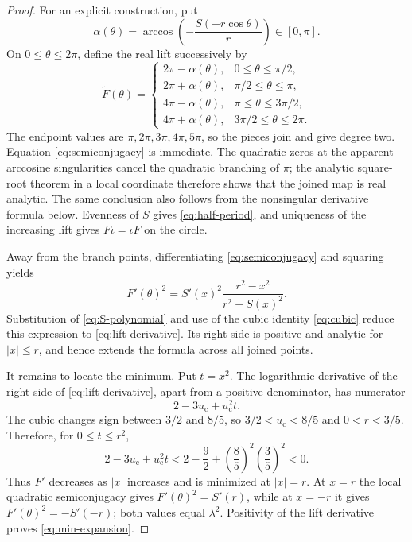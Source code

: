 \documentclass[11pt]{article}
\theoremstyle{definition}
\theoremstyle{remark}
\newcommand{\uc}{u_{\mathrm c}}
\begin{document}
\begin{proof}
For an explicit construction, put
\begin{equation}\label{eq:alpha}
 \alpha(\theta)=
 \arccos\left(-\frac{S(-r\cos\theta)}r\right)\in[0,\pi].
\end{equation}
On $0\le\theta\le2\pi$, define the real lift successively by
\begin{equation}\label{eq:piecewise-lift}
 \widetilde F(\theta)=
 \begin{cases}
  2\pi-\alpha(\theta),&0\le\theta\le\pi/2,\\
  2\pi+\alpha(\theta),&\pi/2\le\theta\le\pi,\\
  4\pi-\alpha(\theta),&\pi\le\theta\le3\pi/2,\\
  4\pi+\alpha(\theta),&3\pi/2\le\theta\le2\pi.
 \end{cases}
\end{equation}
The endpoint values are $\pi,2\pi,3\pi,4\pi,5\pi$, so the pieces join and
give degree two.  Equation \eqref{eq:semiconjugacy} is immediate.  The
quadratic zeros at the apparent arccosine singularities cancel the quadratic
branching of $\pi$; the analytic square-root theorem in a local coordinate
therefore shows that the joined map is real analytic.  The same conclusion
also follows from the nonsingular derivative formula below.  Evenness of
$S$ gives \eqref{eq:half-period}, and uniqueness of the increasing lift gives
$F\iota=\iota F$ on the circle.

Away from the branch points, differentiating
\eqref{eq:semiconjugacy} and squaring yields
\begin{equation}\label{eq:derivative-intermediate}
 F'(\theta)^2
 =S'(x)^2\frac{r^2-x^2}{r^2-S(x)^2}.
\end{equation}
Substitution of \eqref{eq:S-polynomial} and use of the cubic identity
\eqref{eq:cubic} reduce this expression to
\eqref{eq:lift-derivative}.  Its right side is positive and analytic for
$|x|\le r$, and hence extends the formula across all joined points.

It remains to locate the minimum.  Put $t=x^2$.  The logarithmic derivative
of the right side of \eqref{eq:lift-derivative}, apart from a positive
denominator, has numerator
\begin{equation}\label{eq:log-derivative-numerator}
 2-3\uc+\uc^2t.
\end{equation}
The cubic changes sign between $3/2$ and $8/5$, so
$3/2<\uc<8/5$ and $0<r<3/5$.  Therefore, for $0\le t\le r^2$,
\begin{equation}\label{eq:numerator-negative}
 2-3\uc+\uc^2t
 <2-\frac92+\left(\frac85\right)^2
 \left(\frac35\right)^2<0.
\end{equation}
Thus $F'$ decreases as $|x|$ increases and is minimized at $|x|=r$.
At $x=r$ the local quadratic semiconjugacy gives
$F'(\theta)^2=S'(r)$, while at $x=-r$ it gives
$F'(\theta)^2=-S'(-r)$; both values equal $\lambda^2$.  Positivity of the lift derivative proves
\eqref{eq:min-expansion}.
\end{proof}
\end{document}
